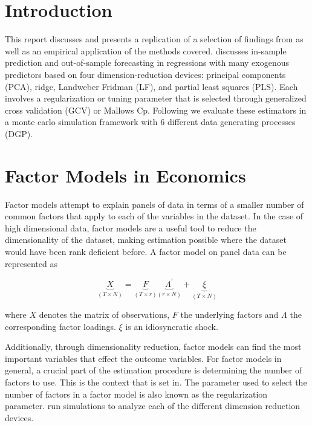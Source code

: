 \renewcommand{\contentsname}{Table of Contents}
\tableofcontents

\newpage

\section{Introduction}
This report discusses and presents a replication of a selection of findings from \citeauthor{carrasco2016sample} as well as an empirical application of the methods covered. \citeauthor{carrasco2016sample} discusses in-sample prediction and out-of-sample forecasting in regressions with many exogenous predictors based on four dimension-reduction devices: principal components (PCA), ridge, Landweber Fridman (LF), and partial least squares (PLS). Each involves a regularization or tuning parameter that is selected through generalized cross validation (GCV) or Mallows Cp. Following \citeauthor{carrasco2016sample} we evaluate these estimators in a monte carlo simulation framework with 6 different data generating processes (DGP). 

\section{Factor Models in Economics}

Factor models attempt to explain panels of data in terms of a smaller number of common factors that apply to each of the variables in the dataset. In the case of high dimensional data, factor models are a useful tool to reduce the dimensionality of the dataset, making estimation possible where the dataset would have been rank deficient before. A factor model on panel data can be represented as

\[\underbrace{X}_{(T \times N)} = \underbrace{F}_{(T \times r)} \underbrace{\Lambda^{'}}_{(r \times N)} + \underbrace{\xi}_{(T \times N)}\]

where $X$ denotes the matrix of observations, $F$ the underlying factors and $\Lambda$ the corresponding factor loadings. $\xi$ is an idiosyncratic shock. 

Additionally, through dimensionality reduction, factor models can find the most important variables that effect the outcome variables.
For factor models in general, a crucial part of the estimation procedure is determining the number of factors to use. This is the context that \citeauthor{carrasco2016sample} is set in. The parameter used to select the number of factors in a factor model is also known as the regularization parameter. \citeauthor{carrasco2016sample} run simulations to analyze each of the different dimension reduction devices. 

